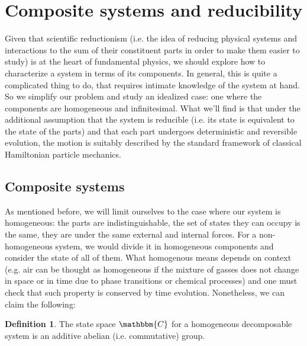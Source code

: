 \documentclass[aps,pra,10pt,twocolumn,floatfix,nofootinbib]{revtex4-1}
\theoremstyle{definition}
\newtheorem{defn}[prop]{Definition}
\begin{document}
\section{Composite systems and reducibility}

Given that scientific reductionism (i.e. the idea of reducing physical systems and interactions to the sum of their constituent parts in order to make them easier to study) is at the heart of fundamental physics, we should explore how to characterize a system in terms of its components. In general, this is quite a complicated thing to do, that requires intimate knowledge of the system at hand. So we simplify our problem and study an idealized case: one where the components are homogeneous and infinitesimal. What we'll find is that under the additional assumption that the system is reducible (i.e. its state is equivalent to the state of the parts) and that each part undergoes deterministic and reversible evolution, the motion is suitably described by the standard framework of classical Hamiltonian particle mechanics.

\subsection{Composite systems}
As mentioned before, we will limit ourselves to the case where our system is homogeneous: the parts are indistinguishable, the set of states they can occupy is the same, they are under the same external and internal forces. For a non-homogeneous system, we would divide it in homogeneous components and consider the state of all of them. What homogenous means depends on context (e.g. air can be thought as homogeneous if the mixture of gasses does not change in space or in time due to phase transitions or chemical processes) and one must check that such property is conserved by time evolution. Nonetheless, we can claim the following:

\begin{defn}\label{reducible_state_space}
The state space $\mathbbm{C}$ for a homogeneous decomposable system is an additive abelian (i.e. commutative) group.
\end{defn}
\end{document}
